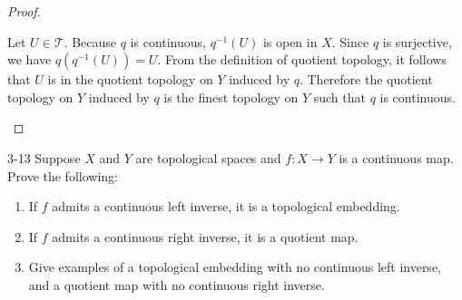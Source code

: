 \begin{proof}
\begin{enumerate}[label={(\alph*)}]
		      Let $U \in \mathscr{T}$. Because $q$ is continuous, $q^{-1}(U)$ is open in $X$. Since $q$ is surjective, we have $q(q^{-1}(U)) = U$. From the definition of quotient topology, it follows that $U$ is in the quotient topology on $Y$ induced by $q$. Therefore the quotient topology on $Y$ induced by $q$ is the finest topology on $Y$ such that $q$ is continuous.
	\end{enumerate}
\end{proof}

\begin{problem}{3-13}
Suppose $X$ and $Y$ are topological spaces and $f: X \to Y$ is a continuous map. Prove the following:
\begin{enumerate}[label={(\alph*)}]
	\item If $f$ admits a continuous left inverse, it is a topological embedding.
	\item If $f$ admits a continuous right inverse, it is a quotient map.
	\item Give examples of a topological embedding with no continuous left inverse, and a quotient map with no continuous right inverse.
\end{enumerate}
\end{problem}

